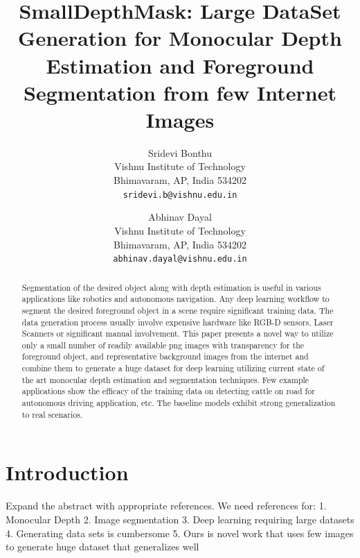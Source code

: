 \documentclass[review]{cvpr}
\begin{document}
\title{SmallDepthMask: Large DataSet Generation for Monocular Depth Estimation and Foreground Segmentation from few Internet Images}

\author{Sridevi Bonthu\\
Vishnu Institute of Technology\\
Bhimavaram, AP, India 534202\\
{\tt\small sridevi.b@vishnu.edu.in}
\and
Abhinav Dayal\\
Vishnu Institute of Technology\\
Bhimavaram, AP, India 534202\\
{\tt\small abhinav.dayal@vishnu.edu.in}
}

\maketitle

\begin{abstract}
  Segmentation of the desired object along with depth estimation is useful in various applications like robotics and autonomous navigation. 
  Any deep learning workflow to segment the desired foreground object in a scene require significant training data.
  The data generation process usually involve expensive hardware like RGB-D sensors, Laser Scanners or significant manual involvement. 
  This paper presents a novel way to utilize only a small number of readily available png images with transparency for the foreground object, 
  and representative background images from the internet and combine them to generate a huge dataset for deep learning
  utilizing current state of the art monocular depth estimation and segmentation techniques. 
  Few example applications show the efficacy of the training data on detecting 
  cattle on road for autonomous driving application, etc. The baseline models exhibit strong generalization to real scenarios.
\end{abstract}

 

\section{Introduction}
Expand the abstract with appropriate references. We need references for:
1. Monocular Depth
2. Image segmentation
3. Deep learning requiring large datasets
4. Generating data sets is cumbersome
5. Ours is novel work that uses few images to generate huge dataset that generalizes well
\end{document}
